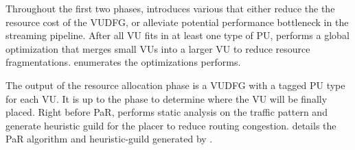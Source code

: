 Throughout the first two phases, \name introduces various  that either reduce the
the resource cost of the VUDFG, or alleviate potential performance bottleneck in the streaming
pipeline.
After all VU fits in at least one type of PU, \name performs a global optimization that merges small VUs into a larger VU to reduce resource fragmentations.
 enumerates the optimizations \name performs.

The output of the resource allocation phase is a VUDFG with a tagged PU type for each VU.
It is up to the
 phase to determine where the VU will be finally placed.
Right before PaR, \name performs static analysis on the traffic pattern and generate heuristic guild
for the placer to reduce routing congestion.
 details the PaR algorithm and heuristic-guild generated by \name.

